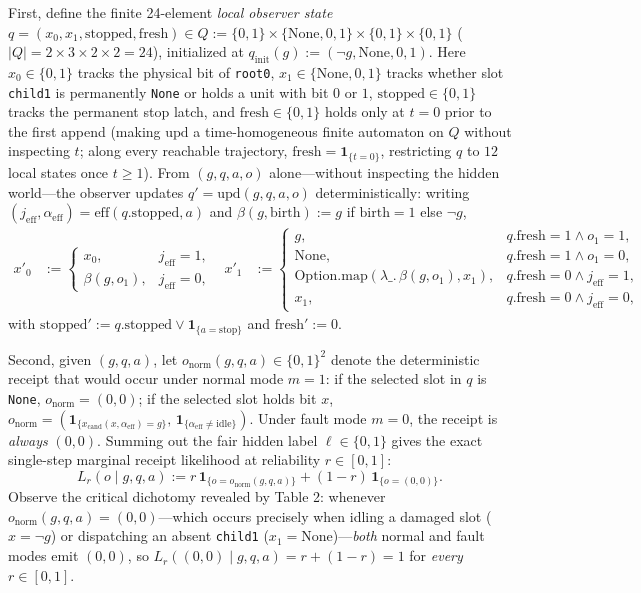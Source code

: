 \documentclass[11pt,a4paper]{article}
\begin{document}
First, define the finite 24-element \emph{local observer state}
\(q = (x_0, x_1, \mathrm{stopped}, \mathrm{fresh}) \in Q := \{0,1\} \times \{\mathrm{None}, 0, 1\} \times \{0,1\} \times \{0,1\}\)
(\(|Q| = 2 \times 3 \times 2 \times 2 = 24\)), initialized at
\(q_{\mathrm{init}}(g) := (\neg g, \mathrm{None}, 0, 1)\). Here
\(x_0 \in \{0,1\}\) tracks the physical bit of \texttt{root0},
\(x_1 \in \{\mathrm{None}, 0, 1\}\) tracks whether slot \texttt{child1}
is permanently \texttt{None} or holds a unit with bit \(0\) or \(1\),
\(\mathrm{stopped} \in \{0,1\}\) tracks the permanent stop latch, and
\(\mathrm{fresh} \in \{0,1\}\) holds only at \(t = 0\) prior to the
first append (making \(\mathrm{upd}\) a time-homogeneous finite
automaton on \(Q\) without inspecting \(t\); along every reachable
trajectory, \(\mathrm{fresh} = \mathbf{1}_{\{t=0\}}\), restricting \(q\)
to \(12\) local states once \(t \ge 1\)). From \((g, q, a, o)\)
alone---without inspecting the hidden world---the observer updates
\(q' = \mathrm{upd}(g, q, a, o)\) deterministically: writing
\((j_{\mathrm{eff}}, \alpha_{\mathrm{eff}}) = \mathrm{eff}(q.\mathrm{stopped}, a)\)
and \(\beta(g, \mathrm{birth}) := g\) if \(\mathrm{birth} = 1\) else
\(\neg g\), \[\begin{aligned}
x'_0 &:= \begin{cases} x_0, & j_{\mathrm{eff}} = 1, \\ \beta(g, o_1), & j_{\mathrm{eff}} = 0, \end{cases}
&
x'_1 &:= \begin{cases} g, & q.\mathrm{fresh} = 1 \land o_1 = 1, \\ \mathrm{None}, & q.\mathrm{fresh} = 1 \land o_1 = 0, \\ \mathrm{Option.map}(\lambda\_.\,\beta(g, o_1), x_1), & q.\mathrm{fresh} = 0 \land j_{\mathrm{eff}} = 1, \\ x_1, & q.\mathrm{fresh} = 0 \land j_{\mathrm{eff}} = 0, \end{cases}
\end{aligned}\] with
\(\mathrm{stopped}' := q.\mathrm{stopped} \lor \mathbf{1}_{\{a = \mathrm{stop}\}}\)
and \(\mathrm{fresh}' := 0\).

Second, given \((g, q, a)\), let
\(o_{\mathrm{norm}}(g, q, a) \in \{0,1\}^2\) denote the deterministic
receipt that would occur under normal mode \(m = 1\): if the selected
slot in \(q\) is \texttt{None}, \(o_{\mathrm{norm}} = (0,0)\); if the
selected slot holds bit \(x\),
\(o_{\mathrm{norm}} = (\mathbf{1}_{\{x_{\mathrm{cand}}(x, \alpha_{\mathrm{eff}}) = g\}},\, \mathbf{1}_{\{\alpha_{\mathrm{eff}} \neq \mathrm{idle}\}})\).
Under fault mode \(m = 0\), the receipt is \emph{always} \((0,0)\).
Summing out the fair hidden label \(\ell \in \{0,1\}\) gives the exact
single-step marginal receipt likelihood at reliability \(r \in [0,1]\):
\[L_r(o \mid g, q, a) := r\,\mathbf{1}_{\{o = o_{\mathrm{norm}}(g, q, a)\}} + (1 - r)\,\mathbf{1}_{\{o = (0,0)\}}.\]
Observe the critical dichotomy revealed by Table 2: whenever
\(o_{\mathrm{norm}}(g, q, a) = (0,0)\)---which occurs precisely when
idling a damaged slot (\(x = \neg g\)) or dispatching an absent
\texttt{child1} (\(x_1 = \mathrm{None}\))---\emph{both} normal and fault
modes emit \((0,0)\), so \(L_r((0,0) \mid g, q, a) = r + (1 - r) = 1\)
for \emph{every} \(r \in [0,1]\).
\end{document}
